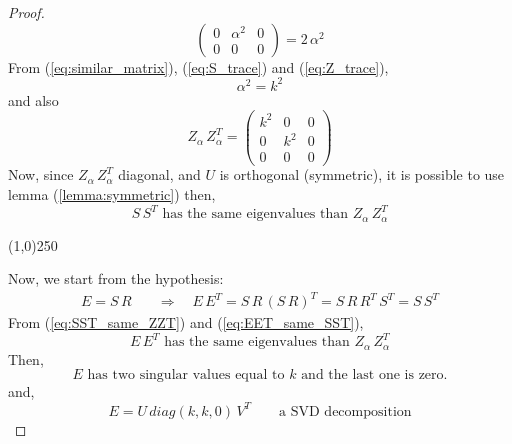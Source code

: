 \begin{proof}
\begin{equation}
\begin{pmatrix}
  0 &  \alpha^2  & 0 \\
  0 &  0  & 0
\end{pmatrix} = 2\,\alpha^2
\end{equation}
From (\ref{eq:similar_matrix}), (\ref{eq:S_trace}) and  (\ref{eq:Z_trace}),
\begin{equation}
\alpha^2 = k^2
\end{equation}
and also
\begin{equation}
\label{eq:ZZT}
Z_{\alpha}\,Z_{\alpha}^T =
\begin{pmatrix}
  k^2 & 0  & 0 \\
  0 &  k^2  & 0 \\
  0 &  0  & 0
\end{pmatrix}
\end{equation}
Now, since $Z_{\alpha}\,Z_{\alpha}^T$ diagonal, and $U$ is orthogonal (symmetric), it is possible to use lemma (\ref{lemma:symmetric}) then,
\begin{equation}
\label{eq:SST_same_ZZT}
\mbox{$S\,S^T$ has the same eigenvalues than $Z_{\alpha}\,Z_{\alpha}^T$}
\end{equation}

\begin{center}
\line(1,0){250}
\end{center}

Now, we start from the hypothesis:
\begin{align}
\label{eq:EET_same_SST}
E=S\,R & \quad\Rightarrow\quad E\,E^T = S\,R\,(S\,R)^T = S\,R\,R^T\,S^T = S\,S^T
\end{align}
From (\ref{eq:SST_same_ZZT}) and (\ref{eq:EET_same_SST}),
\begin{equation}
\label{eq:EET_same_ZZT}
\mbox{$E\,E^T$ has the same eigenvalues than $Z_{\alpha}\,Z_{\alpha}^T$}
\end{equation}
Then,
\begin{equation}
E \mbox{ has two singular values equal to $k$ and the last one is zero.}
\end{equation}
and,
\begin{equation}
E = U\, diag(k,k,0)\,V^T            \quad\quad\mbox{a SVD decomposition}
\end{equation}


\end{proof}

